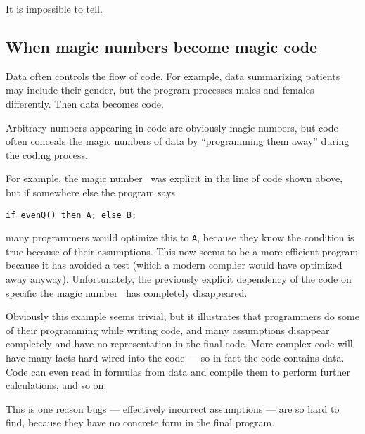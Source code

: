 \documentclass[10pt,a4paper]{article}
\begin{document}
It is impossible to tell. 

\subsection{When magic numbers become magic code}
Data often controls the flow of code. For example, data summarizing patients may include their gender, but the program processes males and females differently. Then data becomes code.

Arbitrary numbers appearing in code are obviously magic numbers, but code often conceals the magic numbers of data by ``programming them away'' during the coding process. 

For example, the magic number \the\magicNumber\ was explicit in the line of code shown above, but if somewhere else the program says

\begin{center}\texttt{if evenQ(\the\magicNumber) then A; else B;}\end{center}

many programmers would optimize this to \texttt{A}, because they know the condition is true because of their assumptions. This now seems to be a more efficient program because it has avoided a test (which a modern complier would have optimized away anyway). Unfortunately, the previously explicit dependency of the code on specific the magic number \the\magicNumber\ has completely disappeared.

Obviously this example seems trivial, but it illustrates that programmers do some of their programming while writing code, and many assumptions disappear completely and have no representation in the final code. More complex code will have many facts hard wired into the code --- so in fact the code contains data. Code can even read in formulas from data and compile them to perform further calculations, and so on.  

This is one reason bugs --- effectively incorrect assumptions --- are so hard to find, because they have no concrete form in the final program.
\end{document}
